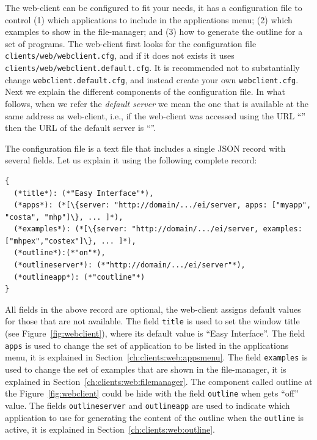 The web-client can be configured to fit your needs, it has a
configuration file to control (1) which applications to include in the
applications menu; (2) which examples to show in the file-manager; and
(3) how to generate the outline for a set of programs.
%
The web-client first looks for the configuration file
\texttt{clients/web/webclient.cfg}, and if it does not exists it uses
\texttt{clients/web/webclient.default.cfg}.
%
It is recommended not to substantially change
\texttt{webclient.default.cfg}, and instead create your own
\texttt{webclient.cfg}.
%
Next we explain the different components of the configuration file. In
what follows, when we refer the \emph{default server} we mean the one
that is available at the same address as web-client, i.e., if the
web-client was accessed using the URL
``'' then the URL of the
default server is ``''.

The configuration file is a text file that includes a single JSON
record with several fields. Let us explain it using the following
complete record:

\bigskip
\begin{lstlisting}
{
  (*title*): (*"Easy Interface"*),
  (*apps*): (*[\{server: "http://domain/.../ei/server, apps: ["myapp", "costa", "mhp"]\}, ... ]*),
  (*examples*): (*[\{server: "http://domain/.../ei/server, examples: ["mhpex","costex"]\}, ... ]*),
  (*outline*):(*"on"*),
  (*outlineserver*): (*"http://domain/.../ei/server"*),
  (*outlineapp*): (*"coutline"*)
}
\end{lstlisting}

\bigskip
\noindent
All fields in the above record are optional, the web-client assigns
default values for those that are not available. 
%
The field \texttt{title} is used to set the window title (see
Figure~\ref{fig:webclient}), where its default value is ``Easy
Interface''. The field \texttt{apps} is used to change the set of
application to be listed in the applications menu, it is explained in
Section~\ref{ch:clients:web:appsmenu}. The field \texttt{examples} is
used to change the set of examples that are shown in the file-manager,
it is explained in Section~\ref{ch:clients:web:filemanager}. The
component called outline at the Figure~\ref{fig:webclient} could be
hide with the field \texttt{outline} when gets ``off'' value. The
fields \texttt{outlineserver} and \texttt{outlineapp} are used to
indicate which application to use for generating the content of the
outline when the \texttt{outline} is active, it is explained in
Section~\ref{ch:clients:web:outline}.


